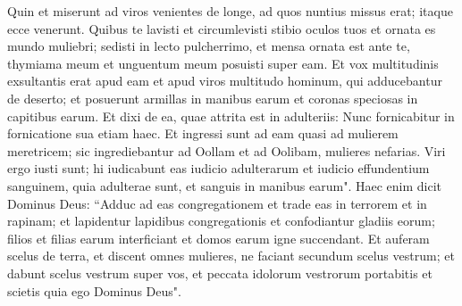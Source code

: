 \begin{biblechapter}
\verse Quin et miserunt ad viros venientes de longe, ad quos nuntius missus erat; itaque ecce venerunt. Quibus te lavisti et circumlevisti stibio oculos tuos et ornata es mundo muliebri; 
\verse sedisti in lecto pulcherrimo, et mensa ornata est ante te, thymiama meum et unguentum meum posuisti super eam. 
\verse Et vox multitudinis exsultantis erat apud eam et apud viros multitudo hominum, qui adducebantur de deserto; et posuerunt armillas in manibus earum et coronas speciosas in capitibus earum. 
\verse Et dixi de ea, quae attrita est in adulteriis: Nunc fornicabitur in fornicatione sua etiam haec. 
\verse Et ingressi sunt ad eam quasi ad mulierem meretricem; sic ingrediebantur ad Oollam et ad Oolibam, mulieres nefarias. 
\verse Viri ergo iusti sunt; hi iudicabunt eas iudicio adulterarum et iudicio effundentium sanguinem, quia adulterae sunt, et sanguis in manibus earum". 
\verse Haec enim dicit Dominus Deus: “Adduc ad eas congregationem et trade eas in terrorem et in rapinam; 
\verse et lapidentur lapidibus congregationis et confodiantur gladiis eorum; filios et filias earum interficiant et domos earum igne succendant. 
\verse Et auferam scelus de terra, et discent omnes mulieres, ne faciant secundum scelus vestrum; 
\verse et dabunt scelus vestrum super vos, et peccata idolorum vestrorum portabitis et scietis quia ego Dominus Deus". 
\end{biblechapter}

